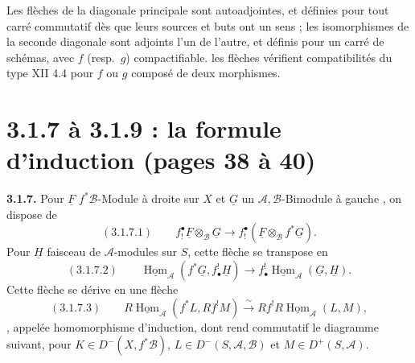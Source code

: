 \documentclass[11pt,a4paper]{article}
\begin{document}
Les flèches de la diagonale principale sont autoadjointes, et définies pour
tout carré commutatif dès que leurs sources et buts ont un sens
 ; les
isomorphismes de la seconde diagonale sont adjoints l'un de l'autre, et
définis pour un carré   de
\struck{\ill{}}schémas, avec $f$ (resp.\ $g$) compactifiable.
 les flèches vérifient \struck{\ill{}} 
 compatibilités du type XII 4.4 pour $f$ ou $g$ composé de deux
morphismes. 



\section*{3.1.7 à 3.1.9 : la formule d'induction (pages 38 à 40)}

\textbf{3.1.7.} Pour $\underline{F}$   
$f^{*}\mathcal{B}$-Module à droite sur $X$ et $\underline{G}$
 un $\mathcal{A},\mathcal{B}$-Bimodule à gauche
, on dispose de
\[
(3.1.7.1)\qquad f^{\bullet}_{!}\underline{F} \otimes_{\mathcal{B}} \underline{G} \longrightarrow f^{\bullet}_{!}(\underline{F} \otimes_{\mathcal{B}} f^{*}\underline{G}).
\]
Pour $\underline{H}$ faisceau de $\mathcal{A}$-modules sur $S$, cette flèche
se transpose en
\[
(3.1.7.2)\qquad \underline{\operatorname{Hom}}_{\mathcal{A}}(f^{*}\underline{G}, f^{!}_{\bullet}\underline{H}) \longrightarrow f^{!}_{\bullet}\underline{\operatorname{Hom}}_{\mathcal{A}}(\underline{G}, \underline{H}).
\]
Cette flèche se dérive en une flèche 
\[
(3.1.7.3)\qquad R\underline{\operatorname{Hom}}_{\mathcal{A}}(f^{*}L, Rf^{!}M) \xrightarrow{\ \sim\ } Rf^{!} R\underline{\operatorname{Hom}}_{\mathcal{A}}(L, M),
\]
, appelée
homomorphisme d'induction, dont   rend commutatif le diagramme suivant, pour
$K \in D^{-}(X, f^{*}\mathcal{B})$, $L \in D^{-}(S, \mathcal{A}, \mathcal{B})$
 
et $M \in D^{+}(S, \mathcal{A})$.
\end{document}
